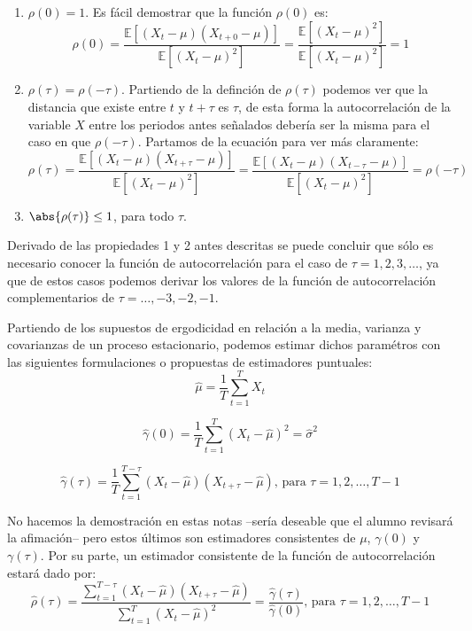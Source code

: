 \documentclass[
  a4paper,
]{article}
\begin{document}
\begin{enumerate}
    \item $\rho(0) = 1$. Es fácil demostrar que la función $\rho(0)$ es:
\begin{equation*}
    \rho(0) = \frac{\mathbb{E}[(X_t - \mu)(X_{t + 0} - \mu)]}{\mathbb{E}[(X_t - \mu)^2]} = \frac{\mathbb{E}[(X_t - \mu)^2]}{\mathbb{E}[(X_t - \mu)^2]} = 1
\end{equation*}

    \item $\rho(\tau) = \rho(-\tau)$. Partiendo de la definción de $\rho(\tau)$ podemos ver que la distancia que existe entre $t$ y $t + \tau$ es $\tau$, de esta forma la autocorrelación de la variable $X$ entre los periodos antes señalados debería ser la misma para el caso en que $\rho(-\tau)$. Partamos de la ecuación para ver más claramente:
\begin{equation*}
    \rho(\tau) = \frac{\mathbb{E}[(X_t - \mu)(X_{t + \tau} - \mu)]}{\mathbb{E}[(X_t - \mu)^2]} = \frac{\mathbb{E}[(X_t - \mu)(X_{t - \tau} - \mu)]}{\mathbb{E}[(X_t - \mu)^2]} = \rho(-\tau)
\end{equation*}

    \item $\abs{\rho(\tau)} \leq 1$, para todo $\tau$.
\end{enumerate}

Derivado de las propiedades 1 y 2 antes descritas se puede concluir que
sólo es necesario conocer la función de autocorrelación para el caso de
\(\tau = 1, 2, 3, \ldots\), ya que de estos casos podemos derivar los
valores de la función de autocorrelación complementarios de
\(\tau = \ldots, -3, -2, -1\).

Partiendo de los supuestos de ergodicidad en relación a la media,
varianza y covarianzas de un proceso estacionario, podemos estimar
dichos paramétros con las siguientes formulaciones o propuestas de
estimadores puntuales: \[
    \hat{\mu} = \frac{1}{T} \sum^T_{t=1} X_t
\]

\[
    \hat{\gamma}(0) = \frac{1}{T} \sum^T_{t=1} (X_t - \hat{\mu})^2 = \hat{\sigma}^2
\]

\[
    \hat{\gamma}(\tau) = \frac{1}{T} \sum^{T - \tau}_{t=1} (X_t - \hat{\mu})(X_{t+\tau} - \hat{\mu}) \mbox{, para } \tau = 1, 2, \ldots, T-1
\]

No hacemos la demostración en estas notas --sería deseable que el alumno
revisará la afimación-- pero estos últimos son estimadores consistentes
de \(\mu\), \(\gamma(0)\) y \(\gamma(\tau)\). Por su parte, un estimador
consistente de la función de autocorrelación estará dado por: \[
    \hat{\rho}(\tau) = \frac{\sum^{T - \tau}_{t=1} (X_t - \hat{\mu})(X_{t+\tau} - \hat{\mu})}{\sum^T_{t=1} (X_t - \hat{\mu})^2} = \frac{\hat{\gamma}(\tau)}{\hat{\gamma}(0)} \mbox{, para } \tau = 1, 2, \ldots, T-1
    \label{Eq_AutoCorr}
\]
\end{document}
